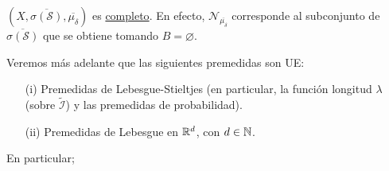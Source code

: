 \begin{remark}
	$(X,\overline{\sigma(\mathscr{S})},\overline{\mu_{\delta}})$ es \underline{completo}. En efecto, $\mathscr{N}_{\overline{\mu_{\delta}}}$ corresponde al subconjunto de $\overline{\sigma(\mathscr{S})}$ que se obtiene tomando $B=\varnothing$.
\end{remark}

\begin{remark}
	Veremos más adelante que las siguientes premedidas son UE:

	\begin{itemize}
		\item[(i)] Premedidas de Lebesgue-Stieltjes (en particular, la función longitud $\lambda$ (sobre $\widetilde{\mathcal{I}}$) y las premedidas de probabilidad).

		\item[(ii)] Premedidas de Lebesgue en $\mathbb{R}^d$, con $d \in \mathbb{N}$.
	\end{itemize}
\end{remark}

\noindent En particular;

